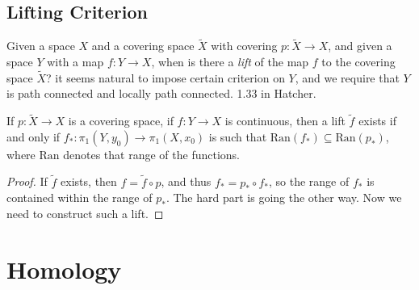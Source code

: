 \documentclass{book}                                                           %
\begin{document}
            \subsection{Lifting Criterion}
                Given a space $X$ and a covering space
                $\tilde{X}$ with covering
                $p:\tilde{X}\rightarrow{X}$, and given a space
                $Y$ with a map $f:Y\rightarrow{X}$, when is there a
                \textit{lift} of the map $f$ to the covering
                space $\tilde{X}$? it seems natural to impose certain
                criterion on $Y$, and we require that $Y$ is
                path connected and locally path connected.
                1.33 in Hatcher.
                \begin{theorem}
                    If $p:\tilde{X}\rightarrow{X}$ is a covering space,
                    if $f:Y\rightarrow{X}$ is continuous, then a
                    lift $\tilde{f}$ exists if and only if
                    $f_{*}:\pi_{1}(Y,y_{0})\rightarrow\pi_{1}(X,x_{0})$
                    is such that
                    $\textrm{Ran}(f_{*})\subseteq\textrm{Ran}(p_{*})$,
                    where $\textrm{Ran}$ denotes that range of the
                    functions.
                \end{theorem}
                \begin{proof}
                    If $\tilde{f}$ exists, then
                    $f=\tilde{f}\circ{p}$, and thus
                    $f_{*}=p_{*}\circ{f}_{*}$, so the range of
                    $f_{*}$ is contained within the range of
                    $p_{*}$. The hard part is going the other way.
                    Now we need to construct such a lift.
                \end{proof}
        \section{Homology}
\end{document}
